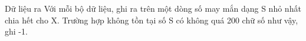 Dữ liệu ra
Với mỗi bộ dữ liệu, ghi ra trên một dòng số may mắn dạng S nhỏ nhất chia hết cho X. Trường hợp không tồn tại số S có không quá 200 chữ số như vậy, ghi -1.